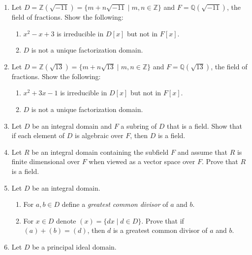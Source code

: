 \documentclass{article}
\theoremstyle{definition}
\newcommand{\Z}{\mathbb{Z}}
\newcommand{\Q}{\mathbb{Q}}
\begin{document}
\begin{enumerate}
            \item Let $D=\Z(\sqrt{-11})=\{m+n\sqrt{-11}\mid m,n\in \Z\}$ and $F=\Q(\sqrt{-11})$, the field of fractions. Show the following:
            
            \begin{enumerate}
                \item $x^2-x+3$ is irreducible in $D[x]$ but not in $F[x]$.
                \item $D$ is not a unique factorization domain.
            \end{enumerate}

            \item Let $D=\Z(\sqrt{13})=\{m+n\sqrt{13}\mid m,n\in \Z\}$ and $F=\Q(\sqrt{13})$, the field of fractions. Show the following:
            
            \begin{enumerate}
                \item $x^2+3x-1$ is irreducible in $D[x]$ but not in $F[x]$.
                \item $D$ is not a unique factorization domain.
            \end{enumerate}

            \item Let $D$ be an integral domain and $F$ a subring of $D$ that is a field. Show that if each element of $D$ is algebraic over $F$, then $D$ is a field.
            
            \item Let $R$ be an integral domain containing the subfield $F$ and assume that $R$ is finite dimensional over $F$ when viewed as a vector space over $F$. Prove that $R$ is a field. 
            
            \item Let $D$ be an integral domain.
            
            \begin{enumerate}
                \item For $a,b \in D$ define a \textit{greatest common divisor} of $a$ and $b$.
                \item For $x\in D$ denote $(x)=\{dx \mid  d\in D\}$. Prove that if $(a)+(b)=(d)$, then $d$ is a greatest common divisor of $a$ and $b$.
            \end{enumerate}

            \item Let $D$ be a principal ideal domain.
            

\end{enumerate}
\end{document}
